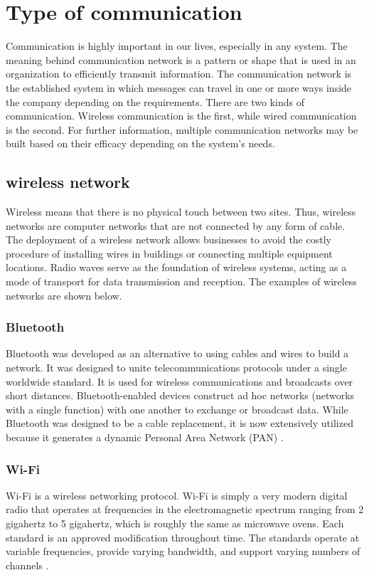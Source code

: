 \section{Type of communication}
Communication is highly important in our lives, especially in any system. The meaning behind communication network is a pattern or shape that is used in an organization to efficiently transmit information. The communication network is the established system in which messages can travel in one or more ways inside the company depending on the requirements. There are two kinds of communication. Wireless communication is the first, while wired communication is the second. For further information, multiple communication networks may be built based on their efficacy depending on the system's needs. 

\subsection{wireless network}
Wireless means that there is no physical touch between two sites. Thus, wireless networks are computer networks that are not connected by any form of cable. The deployment of a wireless network allows businesses to avoid the costly procedure of installing wires in buildings or connecting multiple equipment locations. Radio waves serve as the foundation of wireless systems, acting as a mode of transport for data transmission and reception. The examples of wireless networks are shown below.
\subsubsection{Bluetooth}
Bluetooth was developed as an alternative to using cables and wires to build a network. It was designed to unite telecommunications protocols under a single worldwide standard. It is used for wireless communications and broadcasts over short distances. Bluetooth-enabled devices construct ad hoc networks (networks with a single function) with one another to exchange or broadcast data. While Bluetooth was designed to be a cable replacement, it is now extensively utilized because it generates a dynamic Personal Area Network (PAN) \cite{b2}.

\subsubsection{Wi-Fi}
Wi-Fi is a wireless networking protocol. Wi-Fi is simply a very modern digital radio that operates at frequencies in the electromagnetic spectrum ranging from 2 gigahertz to 5 gigahertz, which is roughly the same as microwave ovens. Each standard is an approved modification throughout time. The standards operate at variable frequencies, provide varying bandwidth, and support varying numbers of channels \cite{b3}.

